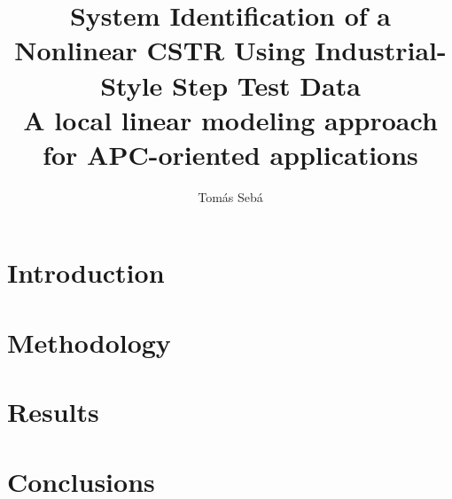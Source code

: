 \documentclass[12pt,a4paper]{report}
\title{
    \textbf{System Identification of a Nonlinear CSTR Using Industrial-Style Step Test Data}\\[0.5em]
    \large A local linear modeling approach for APC-oriented applications
}
\author{Tomás Sebá}
\date{}
\begin{document}
\maketitle
\tableofcontents

\chapter{Introduction}


\chapter{Methodology}


\chapter{Results}


\chapter{Conclusions}




\end{document}
